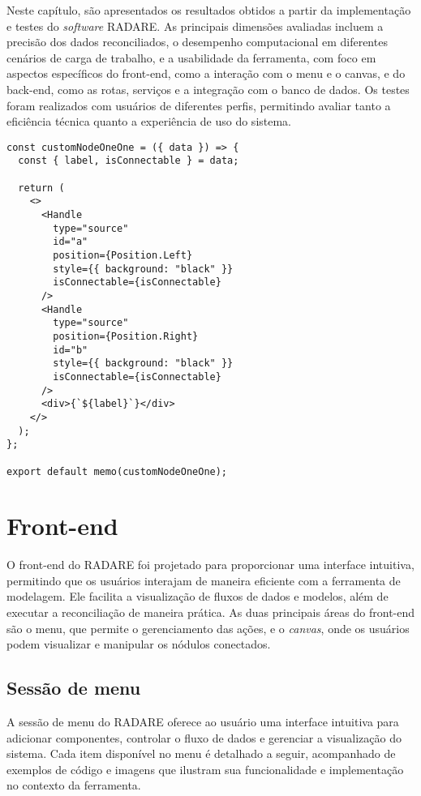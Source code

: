 \label{Cap:Resultados}

Neste capítulo, são apresentados os resultados obtidos a partir da implementação e testes do \textit{software} RADARE. As principais dimensões avaliadas incluem a precisão dos dados reconciliados, o desempenho computacional em diferentes cenários de carga de trabalho, e a usabilidade da ferramenta, com foco em aspectos específicos do front-end, como a interação com o menu e o canvas, e do back-end, como as rotas, serviços e a integração com o banco de dados. Os testes foram realizados com usuários de diferentes perfis, permitindo avaliar tanto a eficiência técnica quanto a experiência de uso do sistema.

\begin{verbatim}
const customNodeOneOne = ({ data }) => {
  const { label, isConnectable } = data;

  return (
    <>
      <Handle
        type="source"
        id="a"
        position={Position.Left}
        style={{ background: "black" }}
        isConnectable={isConnectable}
      />
      <Handle
        type="source"
        position={Position.Right}
        id="b"
        style={{ background: "black" }}
        isConnectable={isConnectable}
      />
      <div>{`${label}`}</div>
    </>
  );
};

export default memo(customNodeOneOne);
\end{verbatim}

\section{Front-end}

O front-end do RADARE foi projetado para proporcionar uma interface intuitiva, permitindo que os usuários interajam de maneira eficiente com a ferramenta de modelagem. Ele facilita a visualização de fluxos de dados e modelos, além de executar a reconciliação de maneira prática. As duas principais áreas do front-end são o menu, que permite o gerenciamento das ações, e o \textit{canvas}, onde os usuários podem visualizar e manipular os nódulos conectados.

\subsection{Sessão de menu}

A sessão de menu do RADARE oferece ao usuário uma interface intuitiva para adicionar componentes, controlar o fluxo de dados e gerenciar a visualização do sistema. Cada item disponível no menu é detalhado a seguir, acompanhado de exemplos de código e imagens que ilustram sua funcionalidade e implementação no contexto da ferramenta.

